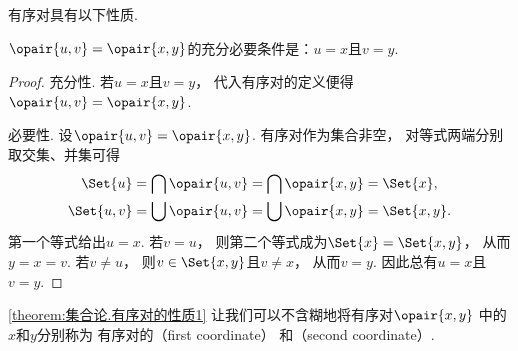 有序对具有以下性质.
\begin{property}\label{theorem:集合论.有序对的性质1}
    \(\opair{u,v} = \opair{x,y}\)的充分必要条件是：\(u=x\)且\(v=y\).
    \begin{proof}
        充分性.
        若\(u=x\)且\(v=y\)，
        代入有序对的定义便得\(\opair{u,v}=\opair{x,y}\).

        必要性.
        设\(\opair{u,v}=\opair{x,y}\).
        有序对作为集合非空，
        对等式两端分别取交集、并集可得
        \begin{align*}
            \Set{u}
            &= \bigcap\opair{u,v}
            = \bigcap\opair{x,y}
            = \Set{x}, \\
            \Set{u,v}
            &= \bigcup\opair{u,v}
            = \bigcup\opair{x,y}
            = \Set{x,y}.
        \end{align*}
        第一个等式给出\(u=x\).
        若\(v=u\)，
        则第二个等式成为\(\Set{x}=\Set{x,y}\)，
        从而\(y=x=v\).
        若\(v\neq u\)，
        则\(v\in\Set{x,y}\)且\(v\neq x\)，
        从而\(v=y\).
        因此总有\(u=x\)且\(v=y\).
    \end{proof}
\end{property}
\cref{theorem:集合论.有序对的性质1} 让我们可以不含糊地将有序对\(\opair{x,y}\)
中的\(x\)和\(y\)分别称为%
有序对的（first coordinate）%
和（second coordinate）.

